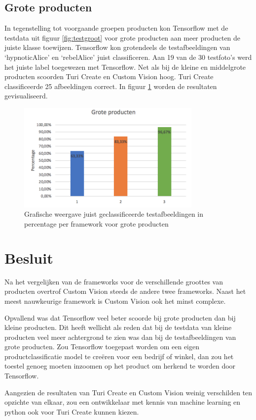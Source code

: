 \subsection{Grote producten}
\label{ssec:Grote producten}

In tegenstelling tot voorgaande groepen producten kon Tensorflow met de testdata uit figuur \ref{fig:testgroot} voor grote producten aan meer producten de juiste klasse toewijzen. Tensorflow kon grotendeels de testafbeeldingen van ‘hypnoticAlice’ en ‘rebelAlice’ juist classificeren. Aan 19 van de 30 testfoto’s werd het juiste label toegewezen met Tensorflow. Net als bij de kleine en middelgrote producten scoorden Turi Create en Custom Vision hoog. Turi Create classificeerde 25 afbeeldingen correct. In figuur \ref{fig:grafiekgroteproducten} worden de resultaten gevisualiseerd.

\begin{figure}[ht!]
  \centering
      \includegraphics[width=0.8\textwidth]{img/grafiekgroteproducten.png}
  \caption{Grafische weergave juist geclassificeerde testafbeeldingen in percentage per framework voor grote producten}
  \label{fig:grafiekgroteproducten}
\end{figure}

\section{Besluit}
\label{sec:Besluit}

Na het vergelijken van de frameworks voor de verschillende groottes van producten overtrof Custom Vision steeds de andere twee frameworks. Naast het meest nauwkeurige framework is Custom Vision ook het minst complexe.

Opvallend was dat Tensorflow veel beter scoorde bij grote producten dan bij kleine producten. Dit heeft wellicht als reden dat bij de testdata van kleine producten veel meer achtergrond te zien was dan bij de testafbeeldingen van grote producten.  Zou Tensorflow toegepast worden om een eigen productclassificatie model te creëren voor een bedrijf of winkel, dan zou het toestel genoeg moeten inzoomen op het product om herkend te worden door Tensorflow.

Aangezien de resultaten van Turi Create en Custom Vision weinig verschilden ten opzichte van elkaar, zou een ontwikkelaar met kennis van machine learning en python ook voor Turi Create kunnen kiezen. 

  